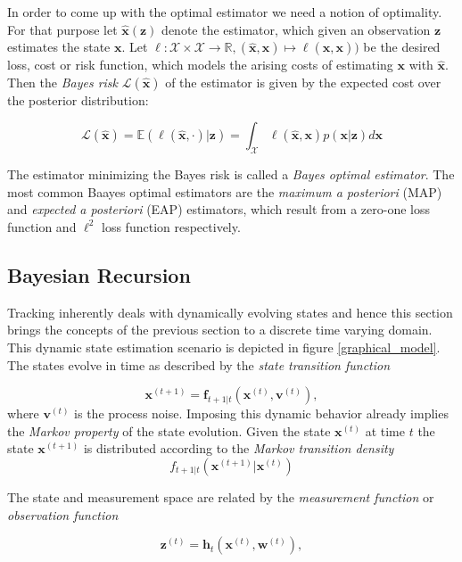 \documentclass[12pt,a4paper]{article}
\begin{document}
In order to come up with the optimal estimator we need a notion of optimality. For that purpose let $\hat{\mathbf{x}}(\mathbf{z})$ denote the estimator, which given an observation $\mathbf{z}$ estimates the state $\mathbf{x}$. Let $\ell : \mathcal{X} \times \mathcal{X} \rightarrow \mathbb{R}, (\hat{\mathbf{x}}, \mathbf{x}) \mapsto \ell(\hat{\mathbf{x}}, \mathbf{x}))$ be the desired loss, cost or risk function, which models the arising costs of estimating $\mathbf{x}$ with $\hat{\mathbf{x}}$. Then the \emph{Bayes risk} $\mathscr{L}(\hat{\mathbf{x}})$ of the estimator is given by the expected cost over the posterior distribution:

$$
\mathscr{L}(\hat{\mathbf{x}}) = \mathbb{E}(\ell(\hat{\mathbf{x}}, \cdot) | \mathbf{z}) = \int_{\mathcal{X}} \ell(\hat{\mathbf{x}}, \mathbf{x})p(\mathbf{x}|\mathbf{z})d\mathbf{x}
$$

The estimator minimizing the Bayes risk is called a \emph{Bayes optimal estimator}. The most common Baayes optimal estimators are the \emph{maximum a posteriori} (MAP) and \emph{expected a posteriori} (EAP) estimators, which result from a zero-one loss function and $\ell^2$ loss function respectively.

\subsection{Bayesian Recursion}
\label{bayesian_recursion}

Tracking inherently deals with dynamically evolving states and hence this section brings the concepts of the previous section to a discrete time varying domain. This dynamic state estimation scenario is depicted in figure \ref{graphical_model}. \\


The states evolve in time as described by the \emph{state transition function}

$$
\mathbf{x}^{(t+1)} = \mathbf{f}_{t+1|t}(\mathbf{x}^{(t)}, \mathbf{v}^{(t)}),
$$
where $\mathbf{v}^{(t)}$ is the process noise. Imposing this dynamic behavior already implies the \emph{Markov property} of the state evolution. Given the state $\mathbf{x}^{(t)}$ at time $t$ the state $\mathbf{x}^{(t+1)}$ is distributed according to the \emph{Markov transition density}
$$
f_{t+1|t}(\mathbf{x}^{(t+1)} | \mathbf{x}^{(t)})
$$

The state and measurement space are related by the \emph{measurement function} or \emph{observation function}

$$
\mathbf{z}^{(t)} = \mathbf{h}_t(\mathbf{x}^{(t)}, \mathbf{w}^{(t)}),
$$
\end{document}

